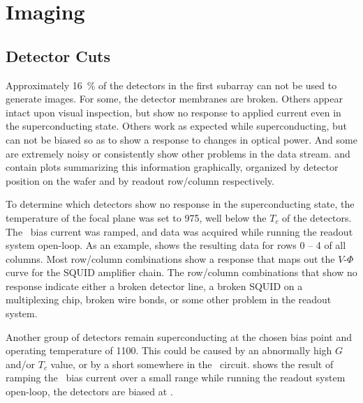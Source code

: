 \chapter{Imaging}\label{c:imaging}


\section{Detector Cuts} \label{sec:ch8-det-cuts}

Approximately \SI{16}{\percent} of the detectors in the first subarray can not be used to generate images.
For some, the detector membranes are broken.
Others appear intact upon visual inspection, but show no response to applied current even in the superconducting state.
Others work as expected while superconducting, but can not be biased so as to show a response to changes in optical power. 
And some are extremely noisy or consistently show other problems in the data stream.
 and  contain plots summarizing this information graphically, organized by detector position on the wafer and by readout row/column respectively.

To determine which detectors show no response in the superconducting state, the temperature of the focal plane was set to \SI{975}{\mK}, well below the $T_c$ of the detectors.
The \TES\ bias current was ramped, and data was acquired while running the readout system open-loop.
As an example,  shows the resulting data for rows 0 -- 4 of all columns.
Most row/column combinations show a response that maps out the $V$-$\Phi$ curve for the SQUID amplifier chain.
The row/column combinations that show no response indicate either a broken detector line, a broken SQUID on a multiplexing chip, broken wire bonds, or some other problem in the readout system.

Another group of detectors remain superconducting at the chosen bias point and operating temperature of \SI{1100}{\mK}.
This could be caused by an abnormally high $G$ and/or $T_c$ value, or by a short somewhere in the \TES\ circuit.
 shows the result of ramping the \TES\ bias current over a small range while running the readout system open-loop, the detectors are biased at \SOC.

